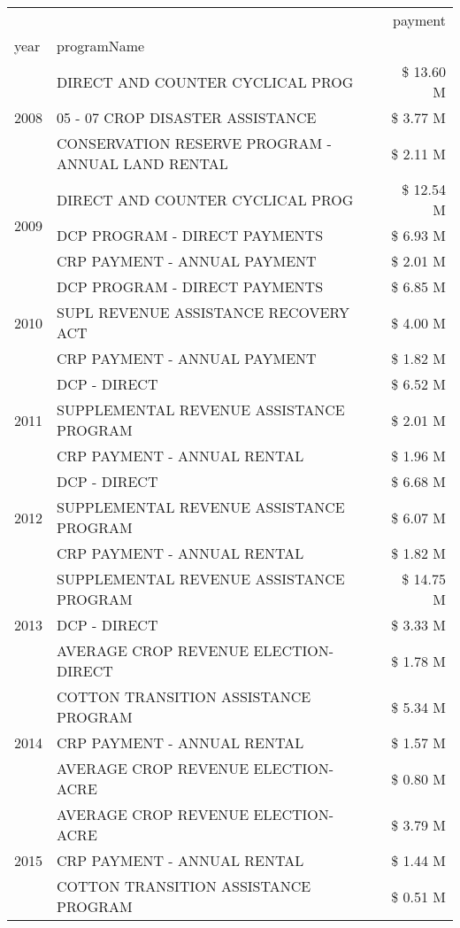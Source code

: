 \begin{tabular}{llr}
\toprule
 &  & payment \\
year & programName &  \\
\midrule
\multirow[t]{3}{*}{2008} & DIRECT AND COUNTER CYCLICAL PROG & \$ 13.60 M \\
 & 05 - 07 CROP DISASTER ASSISTANCE & \$ 3.77 M \\
 & CONSERVATION RESERVE PROGRAM - ANNUAL LAND RENTAL & \$ 2.11 M \\
\cline{1-3}
\multirow[t]{3}{*}{2009} & DIRECT AND COUNTER CYCLICAL PROG & \$ 12.54 M \\
 & DCP PROGRAM - DIRECT PAYMENTS & \$ 6.93 M \\
 & CRP PAYMENT - ANNUAL PAYMENT & \$ 2.01 M \\
\cline{1-3}
\multirow[t]{3}{*}{2010} & DCP PROGRAM - DIRECT PAYMENTS & \$ 6.85 M \\
 & SUPL REVENUE ASSISTANCE RECOVERY ACT & \$ 4.00 M \\
 & CRP PAYMENT - ANNUAL PAYMENT & \$ 1.82 M \\
\cline{1-3}
\multirow[t]{3}{*}{2011} & DCP - DIRECT & \$ 6.52 M \\
 & SUPPLEMENTAL REVENUE ASSISTANCE PROGRAM & \$ 2.01 M \\
 & CRP PAYMENT - ANNUAL RENTAL & \$ 1.96 M \\
\cline{1-3}
\multirow[t]{3}{*}{2012} & DCP - DIRECT & \$ 6.68 M \\
 & SUPPLEMENTAL REVENUE ASSISTANCE PROGRAM & \$ 6.07 M \\
 & CRP PAYMENT - ANNUAL RENTAL & \$ 1.82 M \\
\cline{1-3}
\multirow[t]{3}{*}{2013} & SUPPLEMENTAL REVENUE ASSISTANCE PROGRAM & \$ 14.75 M \\
 & DCP - DIRECT & \$ 3.33 M \\
 & AVERAGE CROP REVENUE ELECTION-DIRECT & \$ 1.78 M \\
\cline{1-3}
\multirow[t]{3}{*}{2014} & COTTON TRANSITION ASSISTANCE PROGRAM & \$ 5.34 M \\
 & CRP PAYMENT - ANNUAL RENTAL & \$ 1.57 M \\
 & AVERAGE CROP REVENUE ELECTION-ACRE & \$ 0.80 M \\
\cline{1-3}
\multirow[t]{3}{*}{2015} & AVERAGE CROP REVENUE ELECTION-ACRE & \$ 3.79 M \\
 & CRP PAYMENT - ANNUAL RENTAL & \$ 1.44 M \\
 & COTTON TRANSITION ASSISTANCE PROGRAM & \$ 0.51 M \\

\end{tabular}
